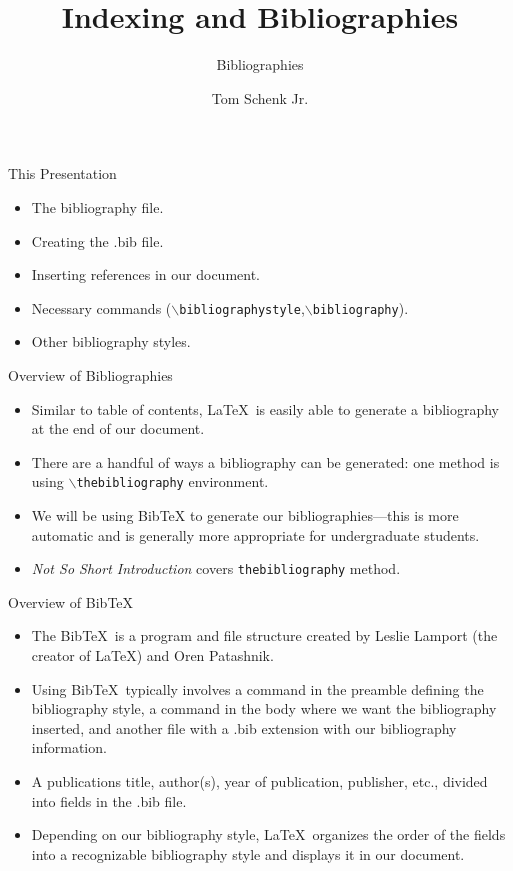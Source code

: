 \documentclass[pdf]{prosper}
\title{Indexing and Bibliographies}
\subtitle{Bibliographies}
\author{Tom Schenk Jr.}		%
\begin{document}
\maketitle
\begin{slide}{This Presentation}
	\begin{itemize}
		\item The bibliography file.
		\item Creating the .bib file.
		\item Inserting references in our document.
		\item Necessary commands (\texttt{$\backslash$bibliographystyle},\texttt{$\backslash$bibliography}).
		\item Other bibliography styles.
	\end{itemize}
\end{slide}
\begin{slide}{Overview of Bibliographies}
	\begin{itemize}
		\item Similar to table of contents, \LaTeX\ is easily able to generate a bibliography at the end of our document.
		\item There are a handful of ways a bibliography can be generated: one method is using \texttt{$\backslash$thebibliography} environment.
		\item We will be using BibTeX to generate our bibliographies---this is more automatic and is generally more appropriate for undergraduate students.
		\item \textit{Not So Short Introduction} covers \texttt{thebibliography} method.
	\end{itemize}
\end{slide}
\begin{slide}{Overview of Bib\TeX}
	\begin{itemize}
		\item The Bib\TeX\ is a program and file structure created by Leslie Lamport (the creator of \LaTeX\mbox{}) and Oren Patashnik.
		\item Using Bib\TeX\ typically involves a command in the preamble defining the bibliography style, a command in the body where we want the bibliography inserted, and another file with a .bib extension with our bibliography information.
		\item A publications title, author(s), year of publication, publisher, etc., divided into fields in the .bib file.
		\item Depending on our bibliography style, \LaTeX\ organizes the order of the fields into a recognizable bibliography style and displays it in our document.
	\end{itemize}
\end{slide}
\end{document}
